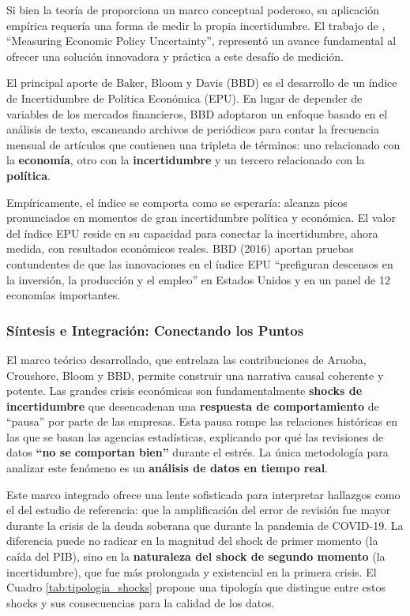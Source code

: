 \documentclass{article}
\begin{document}
Si bien la teoría de \citet{bloom2009} proporciona un marco conceptual poderoso, su aplicación empírica requería una forma de medir la propia incertidumbre. El trabajo de \citet{baker2016}, ``Measuring Economic Policy Uncertainty'', representó un avance fundamental al ofrecer una solución innovadora y práctica a este desafío de medición.

El principal aporte de Baker, Bloom y Davis (BBD) es el desarrollo de un índice de Incertidumbre de Política Económica (EPU). En lugar de depender de variables de los mercados financieros, BBD adoptaron un enfoque basado en el análisis de texto, escaneando archivos de periódicos para contar la frecuencia mensual de artículos que contienen una tripleta de términos: uno relacionado con la \textbf{economía}, otro con la \textbf{incertidumbre} y un tercero relacionado con la \textbf{política}.

Empíricamente, el índice se comporta como se esperaría: alcanza picos pronunciados en momentos de gran incertidumbre política y económica. El valor del índice EPU reside en su capacidad para conectar la incertidumbre, ahora medida, con resultados económicos reales. BBD (2016) aportan pruebas contundentes de que las innovaciones en el índice EPU ``prefiguran descensos en la inversión, la producción y el empleo'' en Estados Unidos y en un panel de 12 economías importantes.

\subsubsection{Síntesis e Integración: Conectando los Puntos}

El marco teórico desarrollado, que entrelaza las contribuciones de Aruoba, Croushore, Bloom y BBD, permite construir una narrativa causal coherente y potente. Las grandes crisis económicas son fundamentalmente \textbf{shocks de incertidumbre} que desencadenan una \textbf{respuesta de comportamiento} de ``pausa'' por parte de las empresas. Esta pausa rompe las relaciones históricas en las que se basan las agencias estadísticas, explicando por qué las revisiones de datos \textbf{``no se comportan bien''} durante el estrés. La única metodología para analizar este fenómeno es un \textbf{análisis de datos en tiempo real}.

Este marco integrado ofrece una lente sofisticada para interpretar hallazgos como el del estudio de referencia: que la amplificación del error de revisión fue mayor durante la crisis de la deuda soberana que durante la pandemia de COVID-19. La diferencia puede no radicar en la magnitud del shock de primer momento (la caída del PIB), sino en la \textbf{naturaleza del shock de segundo momento} (la incertidumbre), que fue más prolongada y existencial en la primera crisis. El Cuadro \ref{tab:tipologia_shocks} propone una tipología que distingue entre estos shocks y sus consecuencias para la calidad de los datos.
\end{document}
